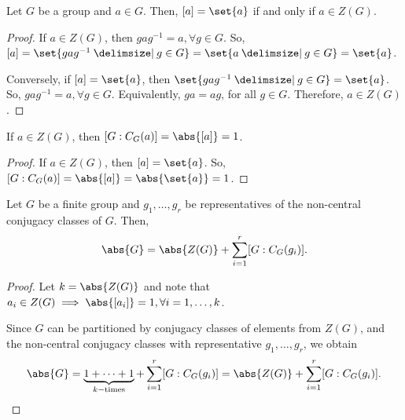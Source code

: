 \documentclass[11pt]{penrose}
\begin{document}
\begin{nlemma}
    Let $G$ be a group and $a \in G$. Then, $[a] = \set{a}$ if and only if $a \in Z(G)$.
\end{nlemma}
\begin{proof}
    If $a \in Z(G)$, then $g a g^{-1} = a, \forall g \in G$. So, $[a] = \set{g a g^{-1} \st g \in G} = \set{a \st g \in G} = \set{a}$.

    Conversely, if $[a] = \set{a}$, then $\set{g a g^{-1} \st g \in G} = \set{a}$. So, $g a g^{-1} = a, \forall g \in G$. Equivalently, $ga = ag$, for all $g \in G$. Therefore, $a \in Z(G)$.
\end{proof}

\begin{ncor}
    If $a \in Z(G)$, then $[G : C_{G}(a)] = \abs{ [a] } = 1$.
\end{ncor}
\begin{proof}
    If $a \in Z(G)$, then $[a] = \set{a}$. So, $[G : C_{G}(a)] = \abs{[a]} = \abs{\set{a}} = 1$.
\end{proof}

\begin{nthm}
    Let $G$ be a finite group and $g_{1}, \dots, g_{r}$ be representatives of the non-central conjugacy classes of $G$. Then,
    \begin{equation*}
        \abs{G} = \abs{Z(G)} + \sum_{i=1}^{r} [G : C_{G}(g_{i})].
    \end{equation*}
\end{nthm}
\begin{proof}
    Let $k = \abs{Z(G)}$ and note that $a_{i} \in Z(G) \implies \abs{[a_{i}]} = 1, \forall i=1,\dots,k$.

    Since $G$ can be partitioned by conjugacy classes of elements from $Z(G)$, and the non-central conjugacy classes with representative $g_{1}, \dots, g_{r}$, we obtain   
    \begin{equation*}
        \abs{G}
        = \underbrace{1 + \dots + 1}_{k-\text{times}} + \sum_{i=1}^{r} [G : C_{G}(g_{i})]
        = \abs{Z(G)} + \sum_{i=1}^{r} [G : C_{G}(g_{i})].\qedhere
    \end{equation*}
\end{proof}
\end{document}
